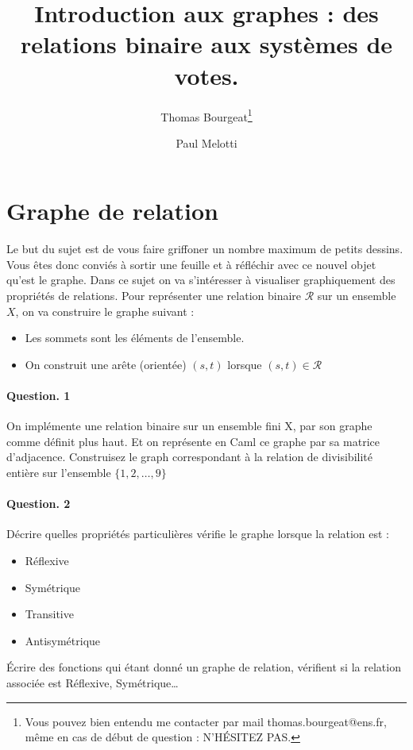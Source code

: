 \documentclass[10pt,a4paper]{article}
\begin{document}
\title{Introduction aux graphes : des relations binaire aux systèmes de votes.}
\author{Thomas Bourgeat\footnote{Vous pouvez bien entendu me contacter par mail thomas.bourgeat@ens.fr, même en cas de début de question : N'HÉSITEZ PAS.}\and Paul Melotti}
\maketitle{}

\section{Graphe de relation}

Le but du sujet est de vous faire griffoner un nombre maximum de petits
dessins. Vous êtes donc conviés à sortir une feuille et à réfléchir avec
ce nouvel objet qu'est le graphe. 
Dans ce sujet on va s'intéresser à visualiser graphiquement des
propriétés de relations. Pour représenter une relation binaire $\mathcal{R}$ sur un ensemble
$X$, on va construire le graphe suivant : 
\begin{itemize}
\item Les sommets sont les éléments de l'ensemble.
\item On construit une arête (orientée) $(s,t)$ lorsque $(s,t)\in
\mathcal{R}$
\end{itemize}
\paragraph{Question. 1\\}
On implémente une relation binaire sur un ensemble fini X, par son graphe
comme définit plus haut. Et on représente en Caml ce graphe par sa
matrice d'adjacence. Construisez le graph correspondant à la relation de
divisibilité entière sur l'ensemble $\{1,2,\dots,9\}$

\paragraph{Question. 2\\}
Décrire quelles propriétés particulières vérifie le graphe lorsque la
relation est :
\begin{itemize}
\item Réflexive
\item Symétrique
\item Transitive
\item Antisymétrique
\end{itemize}  
Écrire des fonctions qui étant donné un graphe de relation, vérifient si
la relation associée est Réflexive, Symétrique\dots
\end{document}
